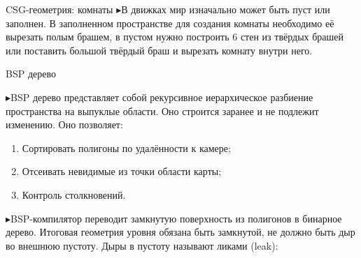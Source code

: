 \documentclass{beamer}
\newcommand{\tri}{{\color{blue!40} $\blacktriangleright$}\:}
\begin{document}
\begin{frame}{CSG-геометрия: комнаты}
\tri В движках мир изначально может быть пуст или заполнен. В заполненном пространстве для создания комнаты необходимо её вырезать полым брашем, в пустом нужно построить 6 стен из твёрдых брашей или поставить большой твёрдый браш и вырезать комнату внутри него.
\end{frame}





\begin{frame}{BSP дерево}
\footnotesize

\tri BSP дерево представляет собой рекурсивное иерархическое разбиение пространства на выпуклые области. Оно строится заранее и не подлежит изменению. Оно позволяет:
\begin{enumerate}
    \item Сортировать полигоны по удалённости к камере;
    \item Отсеивать невидимые из точки области карты;
    \item Контроль столкновений.
\end{enumerate}

\tri BSP-компилятор переводит замкнутую поверхность из полигонов в бинарное дерево. Итоговая геометрия уровня обязана быть замкнутой, не должно быть дыр во внешнюю пустоту. Дыры в пустоту называют ликами (leak):

\begin{center}
\end{center}

\end{frame}
\end{document}
